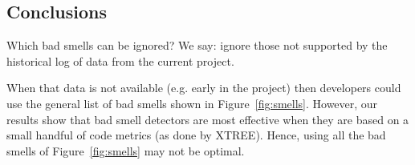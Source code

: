 \documentclass{sig-alternate}
\newcommand{\fig}[1]{Figure~\ref{fig:#1}}
\theoremstyle{break}
\begin{document}
\begin{itemize}

  








% 

\newpage
 
\section{Conclusions}
Which  bad smells can  be ignored? 
We say: ignore those not supported by the historical log of data from
the current project.  

When that data is not available (e.g. early
in the project) then developers could use the general list of
bad smells shown in \fig{smells}. However, 
our results
show that  bad smell detectors are most
effective when they are based
on a small handful of code metrics (as done by XTREE).
Hence, using all the bad smells of \fig{smells} may not be optimal.


\end{itemize}
\end{document}
